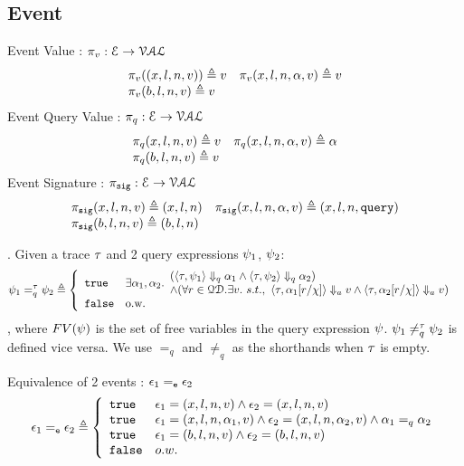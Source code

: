 %
%
\subsection{Event}
%
Event Value : $\pi_v : \mathcal{E} \to \mathcal{VAL}$
\[
\begin{array}{ll}
\pi_v((x, l, n, v)) \triangleq v
&
\pi_v (x, l, n, \alpha, v) \triangleq v
\\
\pi_v (b, l, n, v)  \triangleq v
&
\end{array}
\]
%
Event Query Value : $\pi_{q} : \mathcal{E} \to \mathcal{VAL}$
\[
\begin{array}{ll}
\pi_{q} (x, l, n, v) \triangleq v
&
\pi_{q} (x, l, n, \alpha, v) \triangleq \alpha
\\
\pi_{q} (b, l, n, v)  \triangleq v
&
\end{array}
\]%
% 
Event Signature : $\pi_{\mathtt{sig}} : \mathcal{E} \to \mathcal{VAL}$
\[
\begin{array}{ll}
\pi_{\mathtt{sig}} (x, l, n, v) \triangleq (x, l, n)
&
\pi_{\mathtt{sig}} (x, l, n, \alpha, v) \triangleq (x, l, n, {\tt query})
\\
\pi_{\mathtt{sig}} (b, l, n, v)  \triangleq (b, l, n)
&
\end{array}
\]
%
%
\begin{defn}.
%
\label{def:query_equal}
Given a trace $\mathtt{\tau}$ and 2 query expressions $\psi_1$, $\psi_2$:
$$
\qexpr_1 =_{q}^{\trace} \qexpr_2 \triangleq
\left\{
    \begin{array}{ll} 
      \etrue      
      & 
    \exists \qval_1, \qval_2.
    \begin{array}{l} 
      (\config{\trace,  \qexpr_1} \qarrow \qval_1 \land \config{\trace,  \qexpr_2 } \qarrow \qval_2) 
      \\
      \land (\forall r \in \qdom. \exists v. ~ s.t., ~ 
            \config{\trace, \qval_1[r/\chi]} \aarrow v \land \config{\trace,  \qval_2[r/\chi] } \aarrow v)  
    \end{array}\\
      \efalse         
      & \text{o.w.} 
    \end{array}
    \right.
$$
%
, where $FV(\psi)$ is the set of free variables in the query expression $\psi$.
$\psi_1 \neq_{q}^{\mathtt{\tau}} \psi_2$  is defined vice versa.
%
We use $=_{q}$  and $\neq_{q}$ as the shorthands when $\mathtt{\tau}$ is empty.
\end{defn}
%
Equivalence of 2 events : $\mathtt{\epsilon}_1 =_{\mathtt{e}} \mathtt{\epsilon}_2$
\[
\event_1 \eventeq \event_2 \triangleq
\left\{
\begin{array}{ll}
\etrue & \event_1 = (x, l, n, v) \land \event_2 = (x, l, n, v) \\
\etrue & \event_1 = (x, l, n, \qval_1, v) \land \event_2 = (x, l, n, \qval_2, v)  
\land \qval_1 =_{q} \qval_2\\
\etrue & \event_1 = (b, l, n, v) \land \event_2 = (b, l, n, v) \\
\efalse & o.w.
\end{array}
\right.
\]
